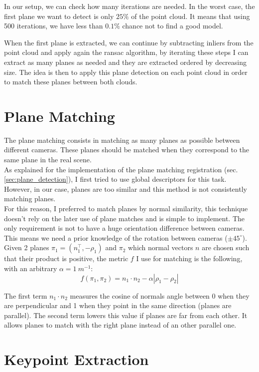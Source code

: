 In our setup, we can check how many iterations are needed. In the worst case, the first plane we want to detect is only $25\%$ of the point cloud. It means that using 500 iterations, we have less than $0.1\%$ chance not to find a good model. 

When the first plane is extracted, we can continue by subtracting inliers from the point cloud and apply again the \acrshort{ransac} algorithm, by iterating these steps I can extract as many planes as needed and they are extracted ordered by decreasing size. The idea is then to apply this plane detection on each point cloud in order to match these planes between both clouds. 

\section{Plane Matching} \label{sec:plane_matching}

The plane matching consists in matching as many planes as possible between different cameras. These planes should be matched when they correspond to the same plane in the real scene. \\
As explained for the implementation of the plane matching registration (sec. \ref{sec:plane_detection}), I first tried to use global descriptors for this task. However, in our case, planes are too similar and this method is not consistently matching planes. \\
For this reason, I preferred to match planes by normal similarity, this technique doesn't rely on the later use of plane matches and is simple to implement. The only requirement is not to have a huge orientation difference between cameras. This means we need a prior knowledge of the rotation between cameras ($\pm 45^\circ$). Given 2 planes $\pi_1=(n_1^\top, -\rho_1)$ and $\pi_2$ which normal vectors $n$ are chosen such that their product is positive, the metric $f$ I use for matching is the following, with an arbitrary $\alpha = 1\:m^{-1}$:
\[
    f(\pi_1, \pi_2) = n_1\cdot n_2 - \alpha \left | \rho_1 - \rho_2 \right |
\]

The first term $n_1\cdot n_2$ measures the cosine of normals angle between 0 when they are perpendicular and 1 when they point in the same direction (planes are parallel). The second term lowers this value if planes are far from each other. It allows planes to match with the right plane instead of an other parallel one.

\section{Keypoint Extraction}

